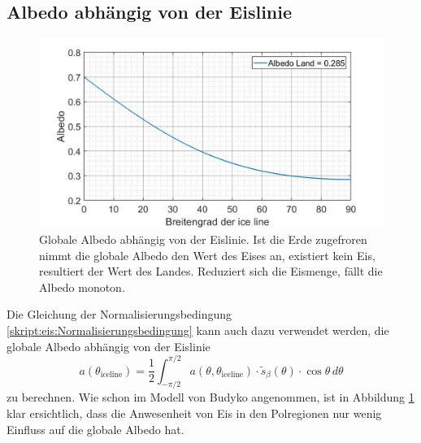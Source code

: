 \begin{refsection}
\subsection{Albedo abhängig von der Eislinie}
\begin{figure}
	\centering
	\includegraphics[width=14cm]{eis/Albedo_abh_von_der_ice_line.jpg}
	\caption{Globale Albedo abhängig von der Eislinie. Ist die Erde zugefroren nimmt die globale Albedo den Wert des Eises an, existiert kein Eis, resultiert der Wert des Landes. Reduziert sich die Eismenge, fällt die Albedo monoton.}
	\label{skript:eis:fig:Albedo_abh_von_der_ice_line}
\end{figure}
Die Gleichung der Normalisierungsbedingung \eqref{skript:eis:Normalisierungsbedingung} kann auch dazu verwendet werden, die globale Albedo abhängig von der Eislinie
\begin{equation}
	a(\theta_\text{iceline})
	=
	\frac{1}{2}\int_{-\pi/2}^{\pi/2}a(\theta,\theta_\text{iceline})\cdot\tilde{s}_{\beta}(\theta)\cdot\cos\theta\,d\theta
\end{equation}
zu berechnen. 
Wie schon im Modell von Budyko angenommen, ist in Abbildung \ref{skript:eis:fig:Albedo_abh_von_der_ice_line} klar ersichtlich, dass die Anwesenheit von Eis in den Polregionen nur wenig Einfluss auf die globale Albedo hat. 

\end{refsection}
